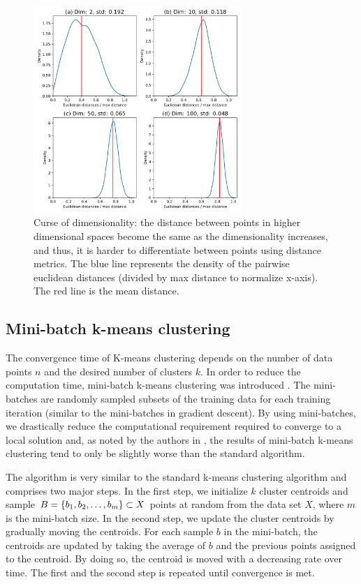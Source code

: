 \begin{figure}[H]
    \centering
    \includegraphics[width=0.7\textwidth]{thesis/figures/curse-of-dimensionality.pdf}
    \caption{Curse of dimensionality: the distance between points in higher dimensional spaces become the same as the dimensionality increases, and thus, it is harder to differentiate between points using distance metrics. The blue line represents the density of the pairwise euclidean distances (divided by max distance to normalize x-axis). The red line is the mean distance.}
    \label{fig:curse-of-dimensionality}
\end{figure}

\subsection{Mini-batch k-means clustering}
\label{sec:mini-batch-k-means-clustering}
The convergence time of K-means clustering depends on the number of data points $n$ and the desired number of clusters $k$. In order to reduce the computation time, mini-batch k-means clustering was introduced \cite{sculley2010}. The mini-batches are randomly sampled subsets of the training data for each training iteration (similar to the mini-batches in gradient descent). By using mini-batches, we drastically reduce the computational requirement required to converge to a local solution and, as noted by the authors in \cite{sculley2010}, the results of mini-batch k-means clustering tend to only be slightly worse than the standard algorithm.

The algorithm is very similar to the standard k-means clustering algorithm and comprises two major steps. In the first step, we initialize $k$ cluster centroids and sample $B=\left\{b_1, b_2, \ldots, b_m\right\} \subset X$ points at random from the data set $X$, where $m$ is the mini-batch size. In the second step, we update the cluster centroids by gradually moving the centroids. For each sample $b$ in the mini-batch, the centroids are updated by taking the average of $b$ and the previous points assigned to the centroid. By doing so, the centroid is moved with a decreasing rate over time. The first and the second step is repeated until convergence is met.

